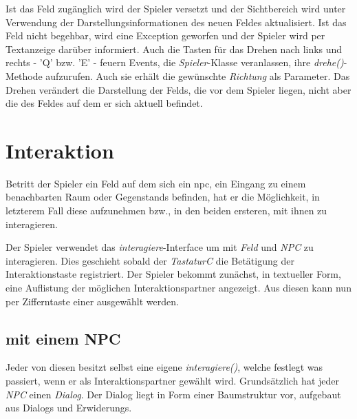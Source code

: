 Ist das \gls{Feld} zugänglich wird der \gls{Spieler} versetzt und der \gls{Sichtbereich} wird unter Verwendung der 
Darstellungsinformationen des neuen \gls{Feld}es aktualisiert.
Ist das \gls{Feld} nicht begehbar, wird eine Exception geworfen und der \gls{Spieler} wird per Textanzeige 
darüber informiert.
Auch die Tasten für das Drehen nach links und rechts - 'Q' bzw. 'E' - feuern Events, die
\textit{Spieler}-Klasse veranlassen, ihre \textit{drehe()}-Methode aufzurufen.  Auch sie erhält die gewünschte \textit{Richtung} 
als Parameter.  Das Drehen verändert die Darstellung der \glspl{Feld}, die vor dem \gls{Spieler} liegen, 
nicht aber die des \gls{Feld}es auf dem er sich aktuell befindet.

\section{Interaktion}
Betritt der \gls{Spieler} ein \gls{Feld} auf dem sich ein \gls{npc}, ein \gls{Eingang} zu einem benachbarten \gls{Raum} oder 
\gls{Gegenstand}s befinden, hat er die Möglichkeit, in letzterem Fall diese aufzunehmen bzw., in den beiden 
ersteren, mit ihnen zu interagieren.

Der \gls{Spieler} verwendet das \textit{interagiere}-Interface um mit \textit{Feld} und \textit{NPC} zu interagieren.
Dies geschieht sobald der 
\textit{TastaturC} die Betätigung der Interaktionstaste registriert. Der \gls{Spieler} bekommt zunächst, 
in textueller Form, eine Auflistung der möglichen Interaktionspartner angezeigt. Aus diesen kann 
nun per Zifferntaste einer ausgewählt werden.

\subsection{mit einem NPC}
Jeder von diesen besitzt selbst eine eigene \textit{interagiere()}, welche festlegt was passiert, 
wenn er als Interaktionspartner gewählt wird. Grundsätzlich hat jeder \textit{NPC} einen \textit{Dialog}.
Der \gls{Dialog} liegt in Form einer Baumstruktur vor, aufgebaut aus \glspl{Dialog} und \glspl{Erwiderung}.

